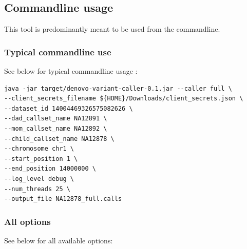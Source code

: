 \documentclass{article}
\begin{document}
\subsection{Commandline usage}
This tool is predominantly meant to be used from the commandline.

\subsubsection*{Typical commandline use}
See below for typical commandline usage : 

\begin{verbatim}
java -jar target/denovo-variant-caller-0.1.jar --caller full \
--client_secrets_filename ${HOME}/Downloads/client_secrets.json \
--dataset_id 14004469326575082626 \
--dad_callset_name NA12891 \
--mom_callset_name NA12892 \
--child_callset_name NA12878 \
--chromosome chr1 \
--start_position 1 \
--end_position 14000000 \
--log_level debug \
--num_threads 25 \
--output_file NA12878_full.calls
\end{verbatim}


\subsubsection*{All options}
See below for all available options:
\end{document}

